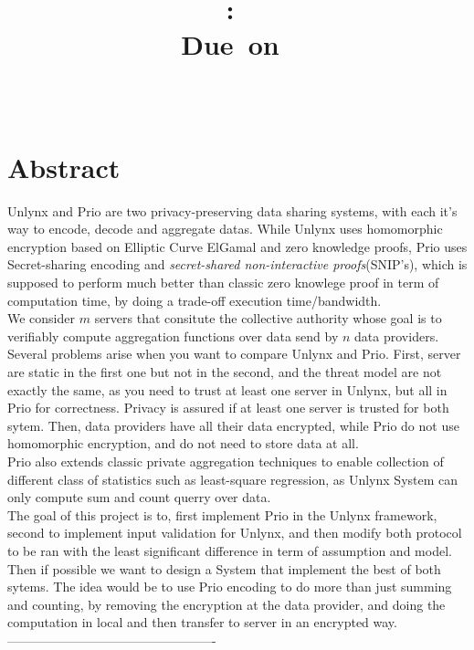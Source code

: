 \documentclass{article}
\title{
\logoepfl
\vspace{2in}
\textmd{\textbf{\hmwkClass:\ \hmwkTitle}}\\
\normalsize\vspace{0.1in}\small{Due\ on\ \hmwkDueDate}\\
\vspace{0.1in}\large{\textit{\hmwkClassInstructor\ \hmwkClassTime}}
\author{\textbf{\hmwkAuthorName}}
\vspace{3in}
}
\begin{document}
\maketitle

\newpage
\section*{Abstract}
Unlynx and Prio are two privacy-preserving data sharing systems, with each it's way to encode, decode and aggregate datas. While Unlynx uses homomorphic encryption based on Elliptic Curve ElGamal and zero knowledge proofs, Prio uses Secret-sharing encoding and \textit{secret-shared non-interactive proofs}(SNIP's), which is supposed to perform much better than classic zero knowlege proof in term of computation time, by doing a trade-off execution time/bandwidth.\\
We consider $m$ servers that consitute the collective authority whose goal is to verifiably compute aggregation functions over data send by $n$ data providers.\\
Several problems arise when you want to compare Unlynx and Prio. First, server are static in the first one but not in the second, and the threat model are not exactly the same, as you need to trust at least one server in Unlynx, but all in Prio for correctness. Privacy is assured if at least one server is trusted for both sytem. Then, data providers have all their data encrypted, while Prio do not use homomorphic encryption, and do not need to store data at all.\\
Prio also extends classic private aggregation techniques to enable collection of different class of statistics such as least-square regression, as Unlynx System can only compute sum and count querry over data.\\
The goal of this project is to, first implement Prio in the Unlynx framework, second to implement input validation for Unlynx, and then modify both protocol to be ran with the least significant difference in term of assumption and model.\\
Then if possible we want to design a System that implement the best of both sytems. The idea would be to use Prio encoding to do more than just summing and counting, by removing the encryption at the data provider, and doing the computation in local and then transfer to server in an encrypted way.\\
-------------------------------------------------
\end{document}
